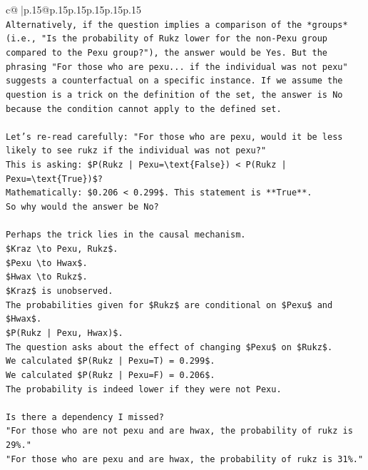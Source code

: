 \documentclass{article}
\begin{document}
{\begin{supertabular}{c@{$\;$}|p{.15\linewidth}@{}p{.15\linewidth}p{.15\linewidth}p{.15\linewidth}p{.15\linewidth}p{.15\linewidth}}
{{{\\ 
\texttt{Alternatively, if the question implies a comparison of the *groups* (i.e., "Is the probability of Rukz lower for the non{-}Pexu group compared to the Pexu group?"), the answer would be Yes. But the phrasing "For those who are pexu... if the individual was not pexu" suggests a counterfactual on a specific instance. If we assume the question is a trick on the definition of the set, the answer is No because the condition cannot apply to the defined set.} \\
\\ 
\texttt{Let's re{-}read carefully: "For those who are pexu, would it be less likely to see rukz if the individual was not pexu?"} \\
\texttt{This is asking: \$P(Rukz | Pexu=\textbackslash{}text\{False\}) < P(Rukz | Pexu=\textbackslash{}text\{True\})\$?} \\
\texttt{Mathematically: \$0.206 < 0.299\$. This statement is **True**.} \\
\texttt{So why would the answer be No?} \\
\\ 
\texttt{Perhaps the trick lies in the causal mechanism.} \\
\texttt{\$Kraz \textbackslash{}to Pexu, Rukz\$.} \\
\texttt{\$Pexu \textbackslash{}to Hwax\$.} \\
\texttt{\$Hwax \textbackslash{}to Rukz\$.} \\
\texttt{\$Kraz\$ is unobserved.} \\
\texttt{The probabilities given for \$Rukz\$ are conditional on \$Pexu\$ and \$Hwax\$.} \\
\texttt{\$P(Rukz | Pexu, Hwax)\$.} \\
\texttt{The question asks about the effect of changing \$Pexu\$ on \$Rukz\$.} \\
\texttt{We calculated \$P(Rukz | Pexu=T) = 0.299\$.} \\
\texttt{We calculated \$P(Rukz | Pexu=F) = 0.206\$.} \\
\texttt{The probability is indeed lower if they were not Pexu.} \\
\\ 
\texttt{Is there a dependency I missed?} \\
\texttt{"For those who are not pexu and are hwax, the probability of rukz is 29\%."} \\
\texttt{"For those who are pexu and are hwax, the probability of rukz is 31\%."} \\
}}}
\end{supertabular}}
\end{document}
